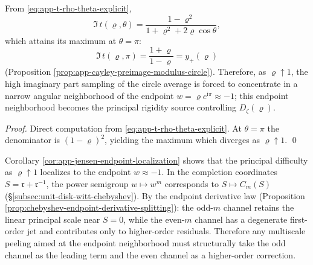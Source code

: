\begin{corollary}\label{cor:app-jensen-endpoint-localization}
From \eqref{eq:app-t-rho-theta-explicit},
\[
\Im\,t(\varrho,\theta)=\frac{1-\varrho^2}{1+\varrho^2+2\varrho\cos\theta},
\]
which attains its maximum at \(\theta=\pi\):
\[
\Im\,t(\varrho,\pi)=\frac{1+\varrho}{1-\varrho}=y_{+}(\varrho)
\]
(Proposition \ref{prop:app-cayley-preimage-modulus-circle}).
Therefore, as \(\varrho\uparrow 1\), the high imaginary part sampling of the circle average is forced to concentrate in a narrow angular neighborhood of the endpoint \(w=\varrho e^{\mathrm{i}\pi}\approx-1\); this endpoint neighborhood becomes the principal rigidity source controlling \(D_{\zeta}(\varrho)\).
\end{corollary}
\begin{proof}
Direct computation from \eqref{eq:app-t-rho-theta-explicit}.
At \(\theta=\pi\) the denominator is \((1-\varrho)^2\), yielding the maximum which diverges as \(\varrho\uparrow 1\). \qed
\end{proof}




\begin{remark}\label{rem:app-jensen-odd-channel-priority}
Corollary \ref{cor:app-jensen-endpoint-localization} shows that the principal difficulty as \(\varrho\uparrow 1\) localizes to the endpoint \(w\approx-1\).
In the completion coordinates \(S=\mathfrak{r}+\mathfrak{r}^{-1}\), the power semigroup \(w\mapsto w^m\) corresponds to \(S\mapsto C_m(S)\) (\S\ref{subsec:unit-disk-witt-chebyshev}).
By the endpoint derivative law (Proposition \ref{prop:chebyshev-endpoint-derivative-splitting}): the odd-\(m\) channel retains the linear principal scale near \(S=0\), while the even-\(m\) channel has a degenerate first-order jet and contributes only to higher-order residuals.
Therefore any multiscale peeling aimed at the endpoint neighborhood must structurally take the odd channel as the leading term and the even channel as a higher-order correction.
\end{remark}

